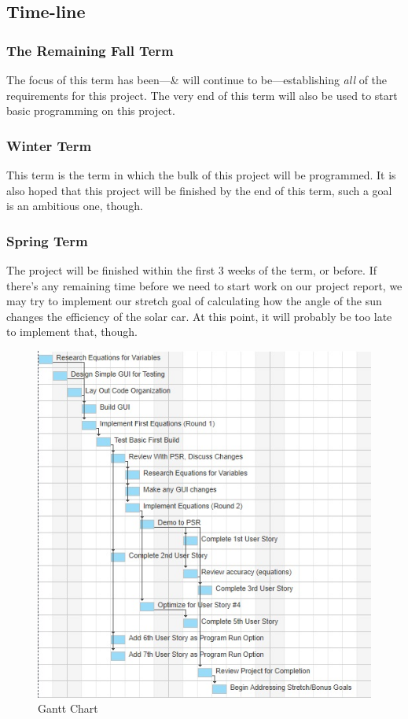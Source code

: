 \documentclass[onecolumn, draftclsnofoot,10pt, compsoc]{IEEEtran}
\begin{document}
    \subsection{Time-line}
        \subsubsection{The Remaining Fall Term}
        The focus of this term has been---\& will continue to be---establishing \textit{all} of the requirements for this project. The very end of this term will also be used to start basic programming on this project.
        
        \subsubsection{Winter Term}
        This term is the term in which the bulk of this project will be programmed. It is also hoped that this project will be finished by the end of this term, such a goal is an ambitious one, though.
        
        \subsubsection{Spring Term}
        The project will be finished within the first 3 weeks of the term, or before. If there's any remaining time before we need to start work on our project report, we may try to implement our stretch goal of calculating how the angle of the sun changes the efficiency of the solar car. At this point, it will probably be too late to implement that, though.
        
    \begin{figure}
        \includegraphics{461Chartcut.jpg}
        \caption{Gantt Chart}
        \label{fig:Gantt}
    \end{figure}
    
\end{document}
